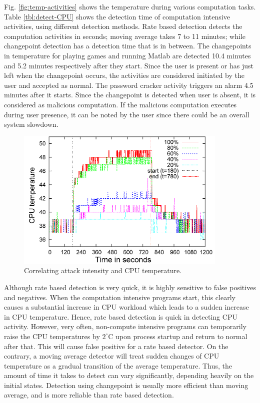 Fig. \ref{fig:temp-activities} shows the temperature during various
computation tasks. Table \ref{tbl:detect-CPU} shows the detection time of computation intensive activities, using different detection methods. Rate based detection detects the computation activities in seconds; moving average takes 7 to 11 minutes; while changepoint detection has a detection time that is in between. 
The changepoints in temperature for playing games
and running Matlab are detected 10.4 minutes and 5.2
minutes respectively after they start. Since the user is present or
has just left when the changepoint occurs, the activities are considered
initiated by the user and accepted as normal. The password cracker
activity triggers an alarm 4.5 minutes after it starts. Since the
changepoint is detected when user is absent, it is considered as
malicious computation. If the malicious computation executes during
user presence, it can be noted by the user since there could be an
overall system slowdown.

\begin{figure}[tb]
\centering
\includegraphics[width=0.9\textwidth]{sensor/passwd-line.png}
\caption{Correlating attack intensity and CPU temperature. }
\label{fig:pwd-vary}
\end{figure}

Although rate based detection is very quick, it is highly sensitive to
false positives and negatives. When the computation intensive programs start, 
this clearly causes a substantial increase in CPU workload
which leads to a sudden increase in CPU temperature. 
Hence, rate based detection is quick in detecting CPU activity.
However, very often, non-compute intensive programs can temporarily raise
the CPU temperatures by $2^\circ$C upon process startup and return to normal
after that. This will cause false positive for a rate based detector. 
On the contrary, a moving average detector will treat
sudden changes of CPU temperature as a gradual transition 
of the average temperature. Thus, the amount of time
it takes to detect can vary significantly,
depending heavily on the initial states. 
Detection using changepoint is usually more efficient than moving average, 
and is more reliable than rate based detection.


